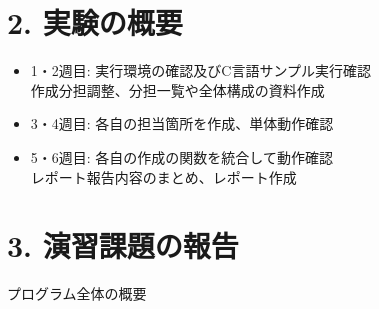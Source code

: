 \documentclass[lualatex, ja=standard, a4j, 12pt]{bxjsarticle}
\begin{document}
\section*{2. 実験の概要}
\begin{itemize}[left=2em]
    \item 1・2週目: 実行環境の確認及びC言語サンプル実行確認 \\
    作成分担調整、分担一覧や全体構成の資料作成
    \item 3・4週目: 各自の担当箇所を作成、単体動作確認
    \item 5・6週目: 各自の作成の関数を統合して動作確認 \\
    レポート報告内容のまとめ、レポート作成
\end{itemize}


\section*{3. 演習課題の報告}
プログラム全体の概要
\end{document}
